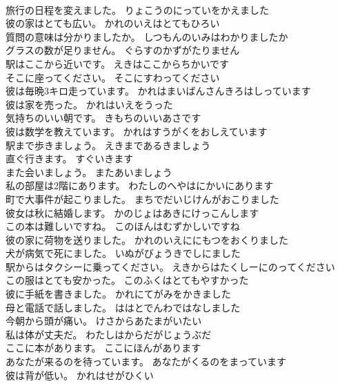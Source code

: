 \documentclass[8pt]{extreport}
\begin{document}
\begin{CJK}{UTF8}{min}
\\	旅行の日程を変えました。	りょこうのにっていをかえました 
\\	彼の家はとても広い。	かれのいえはとてもひろい 
\\	質問の意味は分かりましたか。	しつもんのいみはわかりましたか 
\\	グラスの数が足りません。	ぐらすのかずがたりません 
\\	駅はここから近いです。	えきはここからちかいです 
\\	そこに座ってください。	そこにすわってください 
\\	彼は毎晩3キロ走っています。	かれはまいばんさんきろはしっています 
\\	彼は家を売った。	かれはいえをうった 
\\	気持ちのいい朝です。	きもちのいいあさです 
\\	彼は数学を教えています。	かれはすうがくをおしえています 
\\	駅まで歩きましょう。	えきまであるきましょう 
\\	直ぐ行きます。	すぐいきます 
\\	また会いましょう。	またあいましょう 
\\	私の部屋は2階にあります。	わたしのへやはにかいにあります 
\\	町で大事件が起こりました。	まちでだいじけんがおこりました 
\\	彼女は秋に結婚します。	かのじょはあきにけっこんします 
\\	この本は難しいですね。	このほんはむずかしいですね 
\\	彼の家に荷物を送りました。	かれのいえににもつをおくりました 
\\	犬が病気で死にました。	いぬがびょうきでしにました 
\\	駅からはタクシーに乗ってください。	えきからはたくしーにのってください 
\\	この服はとても安かった。	このふくはとてもやすかった 
\\	彼に手紙を書きました。	かれにてがみをかきました 
\\	母と電話で話しました。	ははとでんわではなしました 
\\	今朝から頭が痛い。	けさからあたまがいたい 
\\	私は体が丈夫だ。	わたしはからだがじょうぶだ 
\\	ここに本があります。	ここにほんがあります 
\\	あなたが来るのを待っています。	あなたがくるのをまっています 
\\	彼は背が低い。	かれはせがひくい 

\end{CJK}
\end{document}
